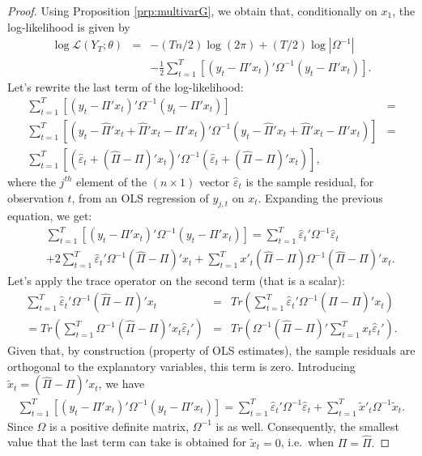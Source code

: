 \documentclass[
  12pt,
]{book}
\theoremstyle{definition}
\theoremstyle{definition}
\theoremstyle{definition}
\theoremstyle{definition}
\theoremstyle{remark}
\begin{document}
\begin{proof}
Using Proposition \ref{prp:multivarG}, we obtain that, conditionally on \(x_1\), the log-likelihood is given by
\begin{eqnarray*}
\log\mathcal{L}(Y_{T};\theta) & = & -(Tn/2)\log(2\pi)+(T/2)\log\left|\Omega^{-1}\right|\\
&  & -\frac{1}{2}\sum_{t=1}^{T}\left[\left(y_{t}-\Pi'x_{t}\right)'\Omega^{-1}\left(y_{t}-\Pi'x_{t}\right)\right].
\end{eqnarray*}
Let's rewrite the last term of the log-likelihood:
\begin{eqnarray*}
\sum_{t=1}^{T}\left[\left(y_{t}-\Pi'x_{t}\right)'\Omega^{-1}\left(y_{t}-\Pi'x_{t}\right)\right] & =\\
\sum_{t=1}^{T}\left[\left(y_{t}-\hat{\Pi}'x_{t}+\hat{\Pi}'x_{t}-\Pi'x_{t}\right)'\Omega^{-1}\left(y_{t}-\hat{\Pi}'x_{t}+\hat{\Pi}'x_{t}-\Pi'x_{t}\right)\right] & =\\
\sum_{t=1}^{T}\left[\left(\hat{\varepsilon}_{t}+(\hat{\Pi}-\Pi)'x_{t}\right)'\Omega^{-1}\left(\hat{\varepsilon}_{t}+(\hat{\Pi}-\Pi)'x_{t}\right)\right],
\end{eqnarray*}
where the \(j^{th}\) element of the \((n\times1)\) vector \(\hat{\varepsilon}_{t}\) is the sample residual, for observation \(t\), from an OLS regression of \(y_{j,t}\) on \(x_{t}\). Expanding the previous equation, we get:
\begin{eqnarray*}
&&\sum_{t=1}^{T}\left[\left(y_{t}-\Pi'x_{t}\right)'\Omega^{-1}\left(y_{t}-\Pi'x_{t}\right)\right]  = \sum_{t=1}^{T}\hat{\varepsilon}_{t}'\Omega^{-1}\hat{\varepsilon}_{t}\\
&&+2\sum_{t=1}^{T}\hat{\varepsilon}_{t}'\Omega^{-1}(\hat{\Pi}-\Pi)'x_{t}+\sum_{t=1}^{T}x'_{t}(\hat{\Pi}-\Pi)\Omega^{-1}(\hat{\Pi}-\Pi)'x_{t}.
\end{eqnarray*}
Let's apply the trace operator on the second term (that is a scalar):
\begin{eqnarray*}
\sum_{t=1}^{T}\hat{\varepsilon}_{t}'\Omega^{-1}(\hat{\Pi}-\Pi)'x_{t} & = & Tr\left(\sum_{t=1}^{T}\hat{\varepsilon}_{t}'\Omega^{-1}(\hat{\Pi}-\Pi)'x_{t}\right)\\
=  Tr\left(\sum_{t=1}^{T}\Omega^{-1}(\hat{\Pi}-\Pi)'x_{t}\hat{\varepsilon}_{t}'\right) & = & Tr\left(\Omega^{-1}(\hat{\Pi}-\Pi)'\sum_{t=1}^{T}x_{t}\hat{\varepsilon}_{t}'\right).
\end{eqnarray*}
Given that, by construction (property of OLS estimates), the sample residuals are orthogonal to the explanatory variables, this term is zero. Introducing \(\tilde{x}_{t}=(\hat{\Pi}-\Pi)'x_{t}\), we have
\begin{eqnarray*}
\sum_{t=1}^{T}\left[\left(y_{t}-\Pi'x_{t}\right)'\Omega^{-1}\left(y_{t}-\Pi'x_{t}\right)\right] =\sum_{t=1}^{T}\hat{\varepsilon}_{t}'\Omega^{-1}\hat{\varepsilon}_{t}+\sum_{t=1}^{T}\tilde{x}'_{t}\Omega^{-1}\tilde{x}_{t}.
\end{eqnarray*}
Since \(\Omega\) is a positive definite matrix, \(\Omega^{-1}\) is as well. Consequently, the smallest value that the last term can take is obtained for \(\tilde{x}_{t}=0\), i.e.~when \(\Pi=\hat{\Pi}.\)


\end{proof}
\end{document}
